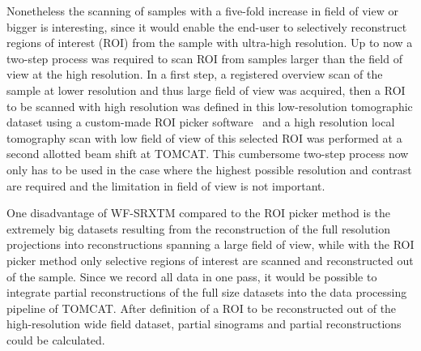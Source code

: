 Nonetheless the scanning of samples with a five-fold increase in field of view or bigger is interesting, since it would enable the end-user to selectively reconstruct regions of interest (ROI) from the sample with ultra-high resolution. Up to now a two-step process was required to scan ROI from samples larger than the field of view at the high resolution. In a first step, a registered overview scan of the sample at lower resolution and thus large field of view was acquired, then a ROI to be scanned with high resolution was defined in this low-resolution tomographic dataset using a custom-made ROI picker software~\cite{Heinzer2008} and a high resolution local tomography scan with low field of view of this selected ROI was performed at a second allotted beam shift at TOMCAT. This cumbersome two-step process now only has to be used in the case where the highest possible resolution and contrast are required and the limitation in field of view is not important.

One disadvantage of WF-SRXTM compared to the ROI picker method is the extremely big datasets resulting from the reconstruction of the full resolution projections into reconstructions spanning a large field of view, while with the ROI picker method only selective regions of interest are scanned and reconstructed out of the sample. Since we record all data in one pass, it would be possible to integrate partial reconstructions of the full size datasets into the data processing pipeline of TOMCAT. After definition of a ROI to be reconstructed out of the high-resolution wide field dataset, partial sinograms and partial reconstructions could be calculated.